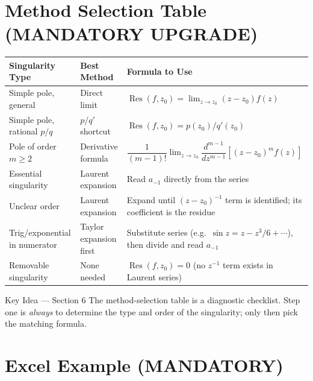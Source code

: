 \documentclass[12pt,a4paper]{article}
\begin{document}
\section{Method Selection Table (MANDATORY UPGRADE)}

\begin{center}
\begin{tabular}{@{}>{\raggedright}p{3.2cm} >{\raggedright}p{3.5cm} >{\raggedright\arraybackslash}p{7cm}@{}}
\toprule
\textbf{Singularity Type} & \textbf{Best Method} & \textbf{Formula to Use} \\
\midrule
Simple pole, general & Direct limit &
$\operatorname{Res}(f,z_0) = \lim_{z\to z_0}(z-z_0)f(z)$ \\
\midrule
Simple pole, rational $p/q$ & $p/q'$ shortcut &
$\operatorname{Res}(f,z_0) = p(z_0)/q'(z_0)$ \\
\midrule
Pole of order $m \geq 2$ & Derivative formula &
$\dfrac{1}{(m-1)!}\lim_{z\to z_0}\dfrac{d^{m-1}}{dz^{m-1}}\!\left[(z-z_0)^m f(z)\right]$ \\
\midrule
Essential singularity & Laurent expansion &
Read $a_{-1}$ directly from the series \\
\midrule
Unclear order & Laurent expansion &
Expand until $(z-z_0)^{-1}$ term is identified; its coefficient is the residue \\
\midrule
Trig/exponential in numerator & Taylor expansion first &
Substitute series (e.g.\ $\sin z = z - z^3/6 + \cdots$), then divide and read $a_{-1}$ \\
\midrule
Removable singularity & None needed &
$\operatorname{Res}(f,z_0) = 0$ (no $z^{-1}$ term exists in Laurent series) \\
\bottomrule
\end{tabular}
\end{center}

\begin{learnbox}{Key Idea --- Section 6}
The method-selection table is a diagnostic checklist.  Step one is \emph{always} to determine
the type and order of the singularity; only then pick the matching formula.
\end{learnbox}

\section{Excel Example (MANDATORY)}
\end{document}
